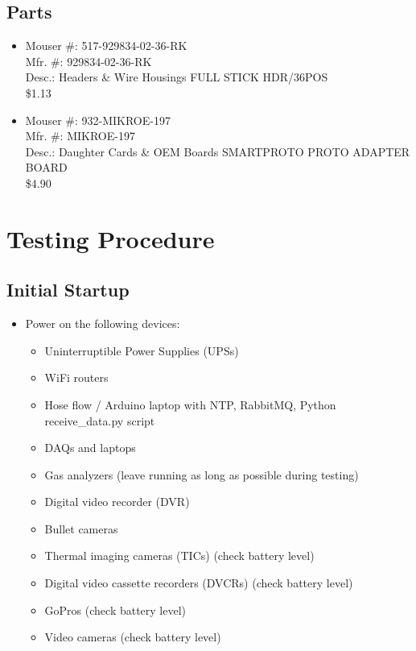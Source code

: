 \documentclass[11pt,oneside]{book}
\begin{document}
\section{Parts}

\begin{itemize}
\item Mouser \#:   517-929834-02-36-RK \\
Mfr. \#: 929834-02-36-RK \\
Desc.: Headers \& Wire Housings FULL STICK HDR/36POS \\
\$1.13

\item Mouser \#:   932-MIKROE-197 \\
Mfr. \#: MIKROE-197 \\
Desc.:  Daughter Cards \& OEM Boards SMARTPROTO PROTO ADAPTER BOARD \\
\$4.90
\end{itemize}




\appendix

\chapter{Testing Procedure}

\section{Initial Startup}

\begin{itemize}
\item Power on the following devices:
    \begin{itemize}
    \item Uninterruptible Power Supplies (UPSs)
    \item WiFi routers
    \item Hose flow / Arduino laptop with NTP, RabbitMQ, Python receive\_data.py script
    \item DAQs and laptops
    \item Gas analyzers (leave running as long as possible during testing)
    \item Digital video recorder (DVR)
    \item Bullet cameras
    \item Thermal imaging cameras (TICs) (check battery level)
    \item Digital video cassette recorders (DVCRs) (check battery level)
    \item GoPros (check battery level)
    \item Video cameras (check battery level)
    \end{itemize}
\end{itemize}
\end{document}
